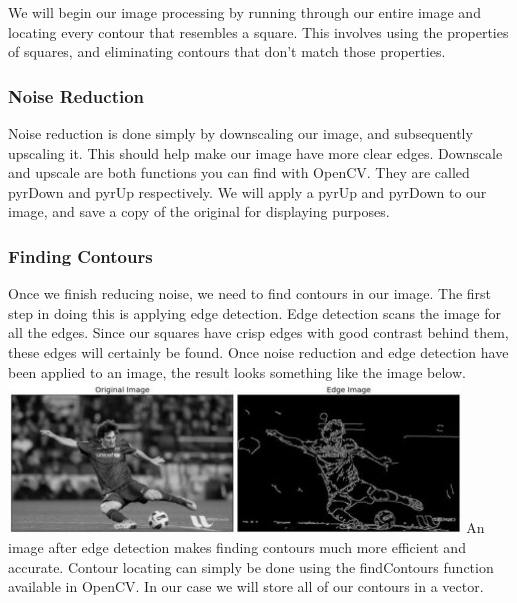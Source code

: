 \documentclass[onecolumn, draftclsnofoot,10pt, compsoc]{IEEEtran}
\begin{document}
\noindent We will begin our image processing by running through our entire image and locating every contour that resembles a square.  This involves using the properties of squares, and eliminating contours that don't match those properties.

\subsubsection{Noise Reduction}
Noise reduction is done simply by downscaling our image, and subsequently upscaling it.  This should help make our image have more clear edges.  Downscale and upscale are both functions you can find with OpenCV. They are called pyrDown and pyrUp respectively.  We will apply a pyrUp and pyrDown to our image, and save a copy of the original for displaying purposes.

\subsubsection{Finding Contours}
Once we finish reducing noise, we need to find contours in our image.  The first step in doing this is applying edge detection.  Edge detection scans the image for all the edges.  Since our squares have crisp edges with good contrast behind them, these edges will certainly be found.  Once noise reduction and edge detection have been applied to an image, the result looks something like the image below.
\newline
\includegraphics[height=4cm]{Images/canny1.jpg}
\newline
An image after edge detection makes finding contours much more efficient and accurate.  Contour locating can simply be done using the findContours function available in OpenCV.  In  our case we will store all of our contours in a vector.
\end{document}
